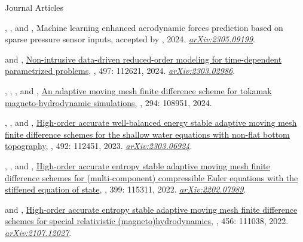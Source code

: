 %
\begin{cvpublicationsection}{Journal Articles}
%
\item[\pubenum] , , and , Machine learning enhanced aerodynamic forces prediction based on sparse pressure sensor inputs, accepted by , 2024. \href{https://arxiv.org/abs/2305.09199}{\em arXiv:2305.09199}.
%
\item[\pubenum]  and , \href{https://doi.org/10.1016/j.jcp.2023.112621}{Non-intrusive data-driven reduced-order modeling for time-dependent parametrized problems}, , 497: 112621, 2024. \href{https://arxiv.org/abs/2303.02986}{\em arXiv:2303.02986}.
%
\item[\pubenum] , , , and , \href{https://doi.org/10.1016/j.cpc.2023.108951}{An adaptive moving mesh finite difference scheme for tokamak magneto-hydrodynamic simulations}, , 294: 108951, 2024.
%
\item[\pubenum] , , and , \href{https://doi.org/10.1016/j.jcp.2023.112451}{High-order accurate well-balanced energy stable adaptive moving mesh finite difference schemes for the shallow water equations with non-flat bottom topography}, , 492: 112451, 2023. \href{https://arxiv.org/abs/2303.06924}{\em arXiv:2303.06924}.
%
\item[\pubenum] , , and , \href{https://doi.org/10.1016/j.cma.2022.115311}{High-order accurate entropy stable adaptive moving mesh finite difference schemes for (multi-component) compressible Euler equations with the stiffened equation of state}, , 399: 115311, 2022. \href{https://arxiv.org/abs/2202.07989}{\em arXiv:2202.07989}.
%
\item[\pubenum]  and , \href{https://doi.org/10.1016/j.jcp.2022.111038}{High-order accurate entropy stable adaptive moving mesh finite difference schemes for special relativistic (magneto)hydrodynamics}, , 456: 111038, 2022. \href{https://arxiv.org/abs/2107.12027}{\em arXiv:2107.12027}.

\end{cvpublicationsection}
